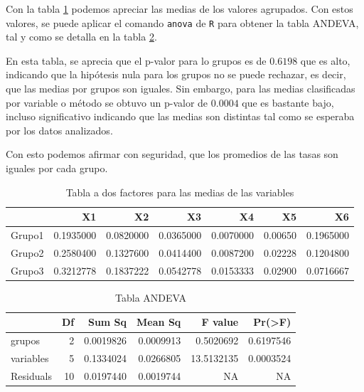 \documentclass{staprojteamusb}
\begin{document}
 Con la tabla \ref{tab:preANOVA} podemos apreciar las medias de los valores agrupados. Con estos valores, se puede aplicar el comando \texttt{anova} de \texttt{R} para obtener la tabla ANDEVA, tal y como se detalla en la tabla \ref{tab:andeva}.

 En esta tabla, se aprecia que el p-valor para lo grupos es de \(0.6198\) que es alto, indicando que la hipótesis nula para los grupos no se puede rechazar, es decir, que las medias por grupos son iguales. Sin embargo, para las medias clasificadas por variable o método se obtuvo un p-valor de \(0.0004\) que es bastante bajo, incluso significativo indicando que las medias son distintas tal como se esperaba por los datos analizados.

 Con esto podemos afirmar con seguridad, que los promedios de las tasas son iguales por cada grupo.

 \begin{table}[h]

 \caption{\label{tab:preANOVA}Tabla a dos factores para las medias de las variables}
 \centering
 \begin{tabular}[t]{l|r|r|r|r|r|r}
 \hline
   & X1 & X2 & X3 & X4 & X5 & X6\\
 \hline
 Grupo1 & 0.1935000 & 0.0820000 & 0.0365000 & 0.0070000 & 0.00650 & 0.1965000\\
 \hline
 Grupo2 & 0.2580400 & 0.1327600 & 0.0414400 & 0.0087200 & 0.02228 & 0.1204800\\
 \hline
 Grupo3 & 0.3212778 & 0.1837222 & 0.0542778 & 0.0153333 & 0.02900 & 0.0716667\\
 \hline
 \end{tabular}
 \end{table}

 \begin{table}[h]

 \caption{\label{tab:andeva}Tabla ANDEVA}
 \centering
 \begin{tabular}[t]{l|r|r|r|r|r}
 \hline
   & Df & Sum Sq & Mean Sq & F value & Pr(>F)\\
 \hline
 grupos & 2 & 0.0019826 & 0.0009913 & 0.5020692 & 0.6197546\\
 \hline
 variables & 5 & 0.1334024 & 0.0266805 & 13.5132135 & 0.0003524\\
 \hline
 Residuals & 10 & 0.0197440 & 0.0019744 & NA & NA\\
 \hline
 \end{tabular}
 \end{table}
\end{document}
